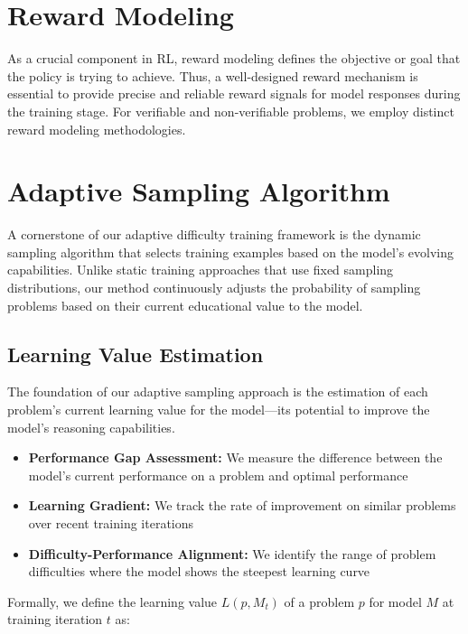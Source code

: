 
\section{Reward Modeling}

As a crucial component in RL, reward modeling defines the objective or goal that the policy is trying to achieve. Thus, a well-designed reward mechanism is essential to provide precise and reliable reward signals for model responses during the training stage. For verifiable and non-verifiable problems, we employ distinct reward modeling methodologies.

\section{Adaptive Sampling Algorithm}
\label{sec:adaptive_sampling}

A cornerstone of our adaptive difficulty training framework is the dynamic sampling algorithm that selects training examples based on the model's evolving capabilities. Unlike static training approaches that use fixed sampling distributions, our method continuously adjusts the probability of sampling problems based on their current educational value to the model.

\subsection{Learning Value Estimation}

The foundation of our adaptive sampling approach is the estimation of each problem's current learning value for the model—its potential to improve the model's reasoning capabilities.

\begin{itemize}
    \item \textbf{Performance Gap Assessment:} We measure the difference between the model's current performance on a problem and optimal performance
    \item \textbf{Learning Gradient:} We track the rate of improvement on similar problems over recent training iterations
    \item \textbf{Difficulty-Performance Alignment:} We identify the range of problem difficulties where the model shows the steepest learning curve
\end{itemize}

Formally, we define the learning value $L(p, M_t)$ of a problem $p$ for model $M$ at training iteration $t$ as:

